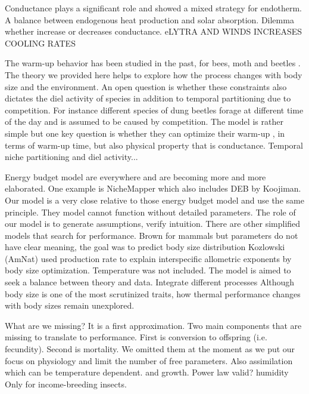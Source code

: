 Conductance plays a significant role and showed a mixed strategy for endotherm.
A balance between endogenous heat production and solar absorption. 
Dilemma whether increase or decreases conductance.
eLYTRA AND WINDS INCREASES COOLING RATES

The warm-up behavior has been studied in the past, for bees, moth and beetles \citep{Kammer1974, Bartholomew1978, Bartholomew1981}.
The theory we provided here helps to explore how the process changes with body size and the environment.
An open question is whether these constraints also dictates the diel activity of species in addition to temporal partitioning due to competition. 
For instance different species of dung beetles forage at different time of the day \citep{Viljanen2010} and is assumed to be caused by competition.
The model is rather simple but one key question is whether they can optimize their warm-up , in terms of warm-up time, but also physical property that is conductance.
Temporal niche partitioning and diel activity...

Energy budget model are everywhere and are becoming more and more elaborated.
One example is NicheMapper which also includes DEB by Koojiman.
Our model is a very close relative to those energy budget model and use the same principle.
They model cannot function without detailed parameters.
The role of our model is to generate assumptions, verify intuition.
 There are other simplified models that search for performance. 
Brown for mammals but parameters do not have clear meaning, the goal was to predict body size distribution 
Kozlowski (AmNat) used production rate to explain interspecific allometric exponents by body size optimization.
Temperature was not included.  
The model is aimed to seek a balance between theory and data.
Integrate different processes 
Although body size is one of the most scrutinized traits,  how thermal performance changes with body sizes remain unexplored.

What are we missing?
It is a first approximation. 
Two main components that are missing to translate to performance.
First is conversion to offspring (i.e. fecundity).
Second is mortality.
We omitted them at the moment as we put our focus on physiology and limit the number of free parameters.
Also assimilation which can be temperature dependent.
and growth.
Power law valid?
humidity
Only for income-breeding insects.
 
